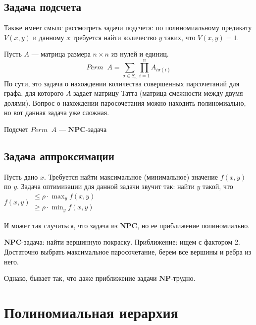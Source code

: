 \subsection{Задача подсчета}

Также имеет смылс рассмотреть задачи подсчета: по полиномиальному предикату \(V(x, y)\) и данному \(x\) требуется найти количество \(y\) таких, что \(V(x, y) = 1\).

\begin{example}
    Пусть \(A\) --- матрица размера \(n \times n\) из нулей и единиц.
    \[Perm\;\;A = \sum_{\sigma \in S_n} \prod_{i = 1}^n A_{i\sigma(i)}\]
    По сути, это задача о нахождении количества совершенных парсочетаний для графа, для которого \(A\) задает матрицу Татта (матрица смежности между двумя долями). Вопрос о нахождении паросочетания можно находить полиномиально, но вот данная задача уже сложная.
\end{example}

\begin{theorem}
    Подсчет \(Perm\;\;A\) --- \(\mathbf{NPC}\)-задача
\end{theorem}

\subsection{Задача аппроксимации}

Пусть дано \(x\). Требуется найти максимальное (минимальное) значение \(f(x, y)\) по \(y\). Задача оптимизации для данной задачи звучит так: найти \(y\) такой, что \(f(x, y) \begin{array}{c}
    \le \rho \cdot \max_y f(x, y)\\
    \ge \rho \cdot \min_y f(x, y)
\end{array} \)

И может так случиться, что задача из \(\mathbf{NPC}\), но ее приближение полиномиально.

\begin{example}
    \(\mathbf{NPC}\)-задача: найти вершинную покраску. Приближение: ищем с фактором 2. Достаточно выбрать максимальное паросочетание, берем все вершины и ребра из него.
\end{example}

Однако, бывает так, что даже приближение задачи \(\mathbf{NP}\)-трудно.


\section{Полиномиальная иерархия}

